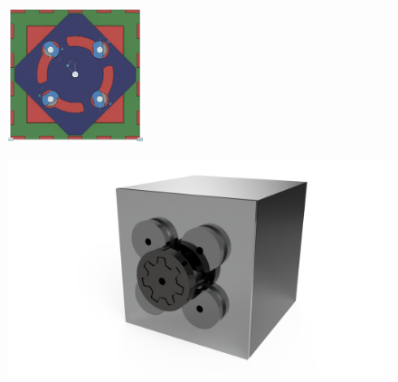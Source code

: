 \begin{figure}[htbp]
    \includegraphics[width=150]{kapitoly/obrazky/M2-mechanizmus_zamceno.png}
    \label{fig:M1}
\end{figure}

\begin{figure}[htbp]
    \centering
    \includegraphics[width=\textwidth]{kapitoly/obrazky/M2-render.PNG}
    \label{fig:M1.0}
\end{figure}


\newpage